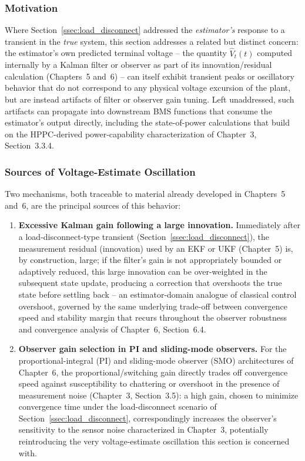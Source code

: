 \subsubsection{Motivation}

Where Section~\ref{ssec:load_disconnect} addressed the \emph{estimator's} response to a transient in the \emph{true} system, this section addresses a related but distinct concern: the estimator's own predicted terminal voltage -- the quantity $\hat{V}_t(t)$ computed internally by a Kalman filter or observer as part of its innovation/residual calculation (Chapters~5 and~6) -- can itself exhibit transient peaks or oscillatory behavior that do not correspond to any physical voltage excursion of the plant, but are instead artifacts of filter or observer gain tuning. Left unaddressed, such artifacts can propagate into downstream BMS functions that consume the estimator's output directly, including the state-of-power calculations that build on the HPPC-derived power-capability characterization of Chapter~3, Section~3.3.4.

\subsubsection{Sources of Voltage-Estimate Oscillation}

Two mechanisms, both traceable to material already developed in Chapters~5 and~6, are the principal sources of this behavior:

\begin{enumerate}
	\item \textbf{Excessive Kalman gain following a large innovation.} Immediately after a load-disconnect-type transient (Section~\ref{ssec:load_disconnect}), the measurement residual (innovation) used by an EKF or UKF (Chapter~5) is, by construction, large; if the filter's gain is not appropriately bounded or adaptively reduced, this large innovation can be over-weighted in the subsequent state update, producing a correction that overshoots the true state before settling back -- an estimator-domain analogue of classical control overshoot, governed by the same underlying trade-off between convergence speed and stability margin that recurs throughout the observer robustness and convergence analysis of Chapter~6, Section~6.4.
	\item \textbf{Observer gain selection in PI and sliding-mode observers.} For the proportional-integral (PI) and sliding-mode observer (SMO) architectures of Chapter~6, the proportional/switching gain directly trades off convergence speed against susceptibility to chattering or overshoot in the presence of measurement noise (Chapter~3, Section~3.5): a high gain, chosen to minimize convergence time under the load-disconnect scenario of Section~\ref{ssec:load_disconnect}, correspondingly increases the observer's sensitivity to the sensor noise characterized in Chapter~3, potentially reintroducing the very voltage-estimate oscillation this section is concerned with.
\end{enumerate}

